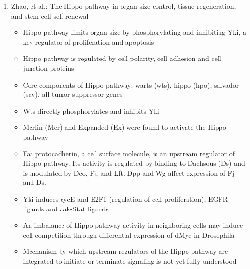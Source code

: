 \documentclass[12pt]{article}
\begin{document}
\begin{enumerate}
\item Zhao, et al.: The Hippo pathway in organ size control, tissue regeneration, and stem cell self-renewal
\begin{itemize}
	\item Hippo pathway limits organ size by phosphorylating and inhibiting Yki, a key regulator of proliferation and apoptosis
	\item Hippo pathway is regulated by cell polarity, cell adhesion and cell junction proteins
	\item Core components of Hippo pathway: warts (wts), hippo (hpo), salvador (sav), all tumor-suppressor genes
	\item Wts directly phosphorylates and inhibits Yki
	\item Merlin (Mer) and Expanded (Ex) were found to activate the Hippo pathway
	\item Fat protocadherin, a cell surface molecule, is an upstream regulator of Hippo pathway. Its activity is regulated by binding to Dachsous (Ds) and is modulated by Dco, Fj, and Lft. Dpp and Wg affect expression of Fj and Ds. 
	\item Yki induces cycE and E2F1 (regulation of cell proliferation), EGFR ligands and Jak-Stat ligands
	\item An imbalance of Hippo pathway activity in neighboring cells may induce cell competition through differential expression of dMyc in Drosophila
	\item Mechanism by which upstream regulators of the Hippo pathway are integrated to initiate or terminate signaling is not yet fully understood
\end{itemize}


\end{enumerate}
\end{document}
